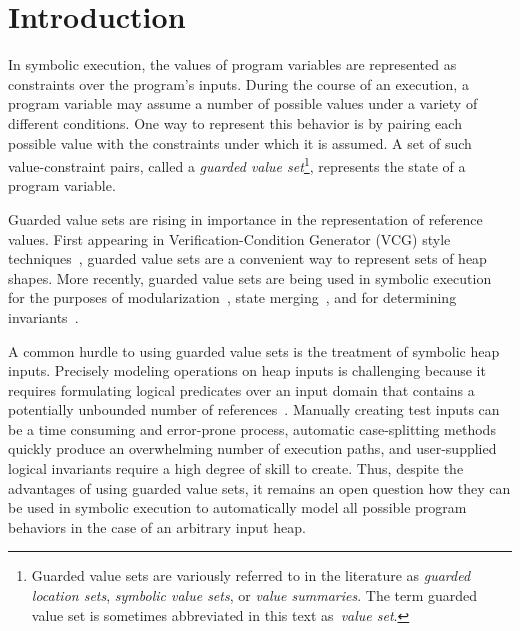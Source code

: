 \section{Introduction}




%

In symbolic execution, the values of program variables are represented as constraints over the program's inputs. During the course of an execution, a program variable may assume a number of possible values under a variety of different conditions. One way to represent this behavior is by pairing each possible value with the constraints under which it is assumed. A set of such value-constraint pairs, called a \emph{guarded value set}\footnote{Guarded value sets are variously referred to in the literature as \emph{guarded location sets}, \emph{symbolic value sets}, or \emph{value summaries}. The term guarded value set is sometimes abbreviated in this text as~\emph{value set}.}, represents the state of a program variable.

Guarded value sets are rising in importance in the representation of reference values. First appearing in Verification-Condition Generator (VCG) style techniques~\cite{Xie:2005,Dillig:2011}, guarded value sets are a convenient way to represent sets of heap shapes. More recently, guarded value sets are being used in symbolic execution for the purposes of modularization~\cite{Yorsh:2008}, state merging~\cite{Sen:2014}, and for determining invariants~\cite{Ferrara:2014,Torlak:2014}.

A common hurdle to using guarded value sets is the treatment of symbolic heap inputs. Precisely modeling operations on heap inputs is challenging because it requires formulating logical predicates over an input domain that contains a potentially unbounded number of references~\cite{Chen:2013,Qu:2011}. Manually creating test inputs can be a time consuming and error-prone process, automatic case-splitting methods~\cite{GSE03,Deng:2007} quickly produce an overwhelming number of execution paths, and user-supplied logical invariants require a high degree of skill to create. Thus, despite the advantages of using guarded value sets, it remains an open question how they can be used in symbolic execution to automatically model all possible program behaviors in the case of an arbitrary input heap.


